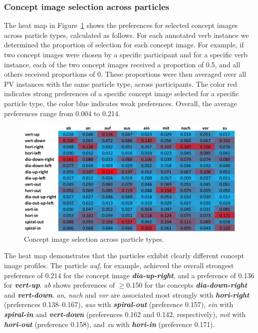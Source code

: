 \documentclass[output=paper]{langsci/langscibook}
\newcommand{\textci}[1]{\textit{\textbf{#1}}}
\begin{document}
\subsubsection{Concept image selection across particles}

The heat map in Figure~\ref{fig:particle-prop} shows the preferences
for selected concept images across particle types, calculated as
follows. For each annotated verb instance we determined the proportion
of selection for each concept image. For example, if two concept
images were chosen by a specific participant and for a specific verb
instance, each of the two concept images received a proportion of 0.5,
and all others received proportions of 0. These proportions were then
averaged over all PV instances with the same particle type, across
participants. The color red indicates strong preferences of a specific
concept image selected for a specific particle type, the color blue
indicates weak preferences. Overall, the average preferences range
from 0.004 to 0.214.

\begin{figure}[htbp]
  \centering
  \includegraphics[width=\linewidth]{figures/dataset_particles_heat2}
  \caption{Concept image selection across particle types.}
  \label{fig:particle-prop}
\end{figure}

\clearpage
The heat map demonstrates that the particles exhibit clearly different
concept image profiles. The particle \textit{auf}, for example, achieved the
overall strongest preference of 0.214 for the concept image
\textci{dia-up-right}, and a preference of 0.136 for
\textci{vert-up}. \textit{ab} shows preferences of $\ge$0.150 for the
concepts \textci{dia-down-right} and \textci{vert-down}. \textit{an},
\textit{nach} and \textit{vor} are associated most strongly with
\textci{hori-right} (preferences 0.138--0.167), \textit{aus} with
\textci{spiral-out} (preference 0.157), \textit{ein} with
\textci{spiral-in} and \textci{vert-down} (preferences 0.162 and
0.142, respectively), \textit{mit} with \textci{hori-out} (preference
0.158), and \textit{zu} with \textci{hori-in} (preference 0.171).
\end{document}
